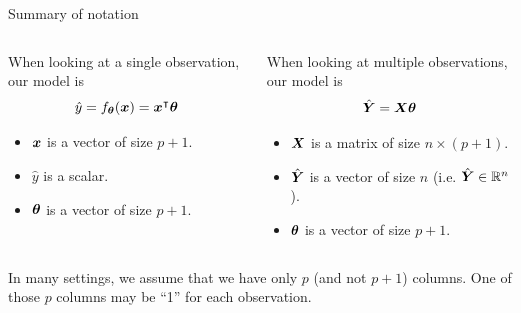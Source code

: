 \documentclass[aspectratio=169]{../latex_main/tntbeamer}  %
\begin{document}
	
	\begin{frame}{Summary of notation}
	    \begin{columns}
	        \begin{column}{.4\textwidth}
	              When looking at a single observation, our model is
	              \begin{equation*}
	                  \hat{y} = f_{\bm{\theta}} (\bm{x}) = \bm{x}^\intercal\bm{\theta}
	              \end{equation*}
	              
	              \begin{itemize}
	                  \item $\bm{x}$ is a vector of size $p + 1$.
	                  \item $\hat{y}$     is a scalar.
	                  \item $\bm{\theta}$     is a vector of size $p + 1$.
	              \end{itemize}
	        \end{column}
	        
	        
	         \begin{column}{.45\textwidth}
	             When looking at multiple observations, our model is
	              \begin{equation*}
	                  \hat{\bm{Y}} = \bm{X}\bm{\theta }
	              \end{equation*}
	              
	              \begin{itemize}
	                  \item $\bm{X}$ is a matrix of size $n \times (p + 1)$.
	                  \item $\hat{\bm{Y}}$ is a vector of size $n$ (i.e.  $\hat{\bm{Y}} \in \mathbb{R}^n$).
	                  \item $\bm{\theta}$ is a vector of size $p + 1$.
	              \end{itemize}
	        \end{column}
	    \end{columns}
	    \bigskip
	    In many settings, we assume that we have only $p$ (and not $p + 1$) columns. One of those $p$ columns may be “1” for each observation.
	\end{frame}
\end{document}
